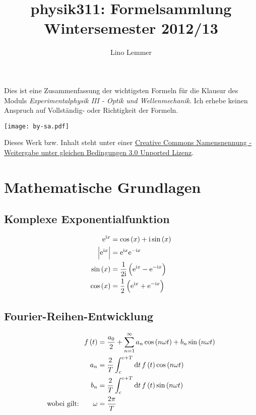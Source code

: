 

\newcommand{\fehlt}{\textbf{\textcolor{red}{Hier fehlt Zeug...}}}

\title{physik311: Formelsammlung\\
	Wintersemester 2012/13}
\author{Lino Lemmer}


\maketitle
	Dies ist eine Zusammenfassung der wichtigsten Formeln für die Klausur des Moduls \emph{Experimentalphysik III - Optik und Wellenmechanik}. Ich erhebe keinen Anspruch auf Vollständig- oder Richtigkeit der Formeln.

	\begin{center}
		\texttt{[image: by-sa.pdf]}

		Dieses Werk bzw. Inhalt steht unter einer \href{http://creativecommons.org/licenses/by-sa/3.0/deed.de}{Creative Commons Namensnennung - Weitergabe unter gleichen Bedingungen 3.0 Unported Lizenz}.
	\end{center}


	\section{Mathematische Grundlagen}

		\subsection{Komplexe Exponentialfunktion}
			\begin{align*}
				\exp{\i x}&=\cos\del{x}+\i\sin\del{x}\\
				\abs{\exp{\i x}}&=\exp{\i x}\exp{-\i x}\\
				\sin\del x&=\frac{1}{2\i}\del{\exp{\i x}-\exp{-\i x}}\\
				\cos\del x&=\half\del{\exp{\i x}+\exp{-\i x}}
			\end{align*}

		\subsection{Fourier-Reihen-Entwicklung}
			\begin{align*}
				f\del{t}&=\frac{a_0}{2}+\sum_{n=1}^\infty a_n\cos\del{n\omega t}+b_n\sin\del{n\omega t}\\
				a_n&=\frac{2}{T}\int_c^{c+T}\dif t \, f\del{t}\cos\del{n\omega t}\\
				b_n&=\frac{2}{T}\int_c^{c+T}\dif t \, f\del{t}\sin\del{n\omega t}\\
				\text{wobei gilt:}\qquad\omega&=\frac{2\pi}{T}
			\end{align*}


